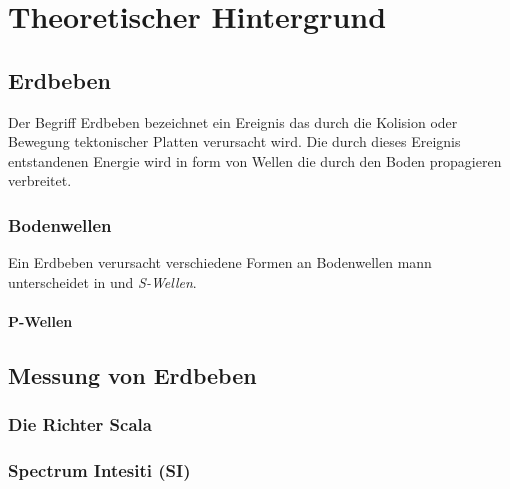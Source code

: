 \documentclass[class=scrbook, crop=false]{standalone}
\begin{document}
\ifstandalone

    
\fi

\chapter{Theoretischer Hintergrund}
\section{Erdbeben}
Der Begriff Erdbeben bezeichnet ein Ereignis das durch die Kolision oder Bewegung tektonischer Platten verursacht wird. Die durch dieses Ereignis entstandenen Energie wird in form von Wellen die durch den Boden propagieren verbreitet.
\subsection{Bodenwellen}
Ein Erdbeben verursacht verschiedene Formen an Bodenwellen mann unterscheidet in   und \textit{S-Wellen}.
\subsubsection{P-Wellen}
 

\section{Messung von Erdbeben}

\subsection{Die Richter Scala}

\subsection{Spectrum Intesiti (SI)}



\ifstandalone
    \printbibliography[heading=bibintoc]                         \cleardoublepage




\fi
\end{document}
